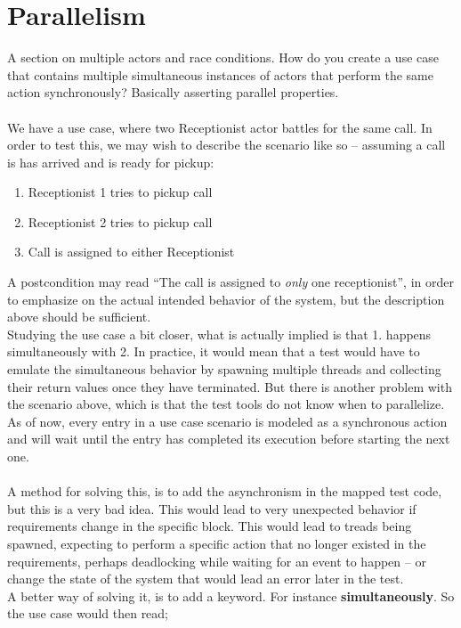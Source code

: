 \section{Parallelism}
\label{sec:parallelism}
A section on multiple actors and race conditions. How do you create a use case that contains multiple simultaneous instances of actors that perform the same action synchronously? Basically asserting parallel properties.\\\\
We have a use case, where two Receptionist actor battles for the same call. In order to test this, we may wish to describe the scenario like so -- assuming a call is has arrived and is ready for pickup:
\begin{enumerate}
 \item Receptionist 1 tries to pickup call
 \item Receptionist 2 tries to pickup call
 \item Call is assigned to either Receptionist
\end{enumerate}
A postcondition may read ``The call is assigned to \emph{only} one receptionist'', in order to emphasize on the actual intended behavior of the system, but the description above should be sufficient.\\
Studying the use case a bit closer, what is actually implied is that 1. happens simultaneously with 2. In practice, it would mean that a test would have to emulate the simultaneous behavior by spawning multiple threads and collecting their return values once they have terminated. But there is another problem with the scenario above, which is that the test tools do not know when to parallelize. As of now, every entry in a use case scenario is modeled as a synchronous action and will wait until the entry has completed its execution before starting the next one.\\\\
A method for solving this, is to add the asynchronism in the mapped test code, but this is a very bad idea. This would lead to very unexpected behavior if requirements change in the specific block. This would lead to treads being spawned, expecting to perform a specific action that no longer existed in the requirements, perhaps deadlocking while waiting for an event to happen -- or change the state of the system that would lead an error later in the test.\\
A better way of solving it, is to add a keyword. For instance \textbf{simultaneously}. So the use case would then read;
